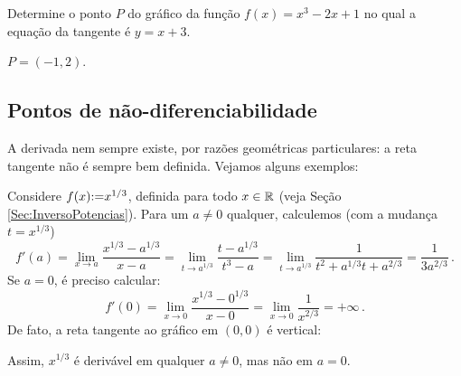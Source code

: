 \begin{exo}
Determine o ponto $P$ do gráfico da função $f(x)=x^3-2x+1$ 
no qual a equação da tangente é $y=x+3$.
\begin{sol}
$P=(-1,2)$.
\end{sol}
\end{exo}


\subsection{Pontos de não-diferenciabilidade}
A derivada nem sempre existe, por razões geométricas particulares: a reta
tangente não é sempre bem definida. Vejamos alguns exemplos:
\begin{ex}\label{Ex:derivracine}
Considere $f(x){:=} x^{1/3}$, definida para todo $x\in \mathbb{R}$ (veja Seção
\ref{Sec:InversoPotencias}).
Para um $a\neq 0$ qualquer, calculemos (com a mudança $t=x^{1/3}$)
$$f'(a)=\lim_{x\to a}\frac{x^{1/3}-a^{1/3}}{x-a}=
\lim_{t\to a^{1/3}}\frac{t-a^{1/3}}{t^3-a}=\lim_{t\to
a^{1/3}}\frac{1}{t^2+a^{1/3}t+a^{2/3}}=\frac{1}{3a^{2/3}}\,.
$$
Se $a=0$, é preciso calcular:
$$
f'(0)=\lim_{x\to 0}\frac{x^{1/3}-0^{1/3}}{x-0}=
\lim_{x\to 0}\frac{1}{x^{2/3}}=+\infty\,.
$$
De fato, a reta tangente ao gráfico em $(0,0)$ é vertical:
\begin{center}
\begin{bmlimage}\end{bmlimage}
\end{center} 
Assim, $x^{1/3}$ é derivável em qualquer $a\neq 0$, mas não em $a=0$. 
\end{ex}



